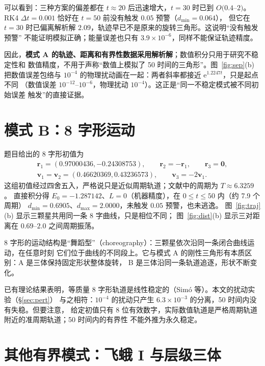 \documentclass[UTF8,fontset=windows,11pt,a4paper]{ctexart}
\newcommand{\vect}[1]{\mathbf{#1}}
\newcommand{\ee}{\mathrm{e}}
\begin{document}
可以看到：三种方案的偏差都在 $t\approx20$ 后迅速增大，$t=30$ 时已到 $O(0.4$--$2)$。
RK4 $\Delta t=0.001$ 恰好在 $t=50$ 前没有触发 $0.05$ 预警（$d_{\min}=0.064$），
但它在 $t=30$ 时已偏离解析解 $2.09$，轨迹早已不是原来的旋转三角形。这说明“没有触发预警”
不能证明模拟正确；能量误差也只有 $3.9\times10^{-6}$，同样不能保证轨迹精度。

因此，\textbf{模式 A 的轨迹、距离和有界性数据采用解析解}；数值积分只用于研究不稳定性和
数值精度，不用于声称“数值上模拟了 50 时间的三角形”。图~\ref{fig:sep}(b) 把数值误差包络与
$10^{-4}$ 的物理扰动画在一起：两者斜率都接近 $\ee^{1.2247t}$，只是起点不同
（数值误差 $10^{-12}$--$10^{-6}$，物理扰动 $10^{-4}$）。这正是“同一不稳定模式被不同初始误差
触发”的直接证据。

\section{模式 B：8 字形运动}\label{sec:eight}

题目给出的 8 字形初值为
\begin{gather}
\vect r_1=(0.97000436,-0.24308753),\qquad
\vect r_2=-\vect r_1,\qquad
\vect r_3=\vect 0,\label{eq:icB-r}\\
\vect v_1=\vect v_2=(0.46620369,0.43236573),\qquad
\vect v_3=-2\vect v_1.\label{eq:icB-v}
\end{gather}
这组初值经过四舍五入，严格说只是近似周期轨道；文献中的周期为 $T\approx6.3259$。
直接积分得 $E_0=-1.287142$、$L=0$（机器精度），在 $0\le t\le50$ 内（约 7.9 个周期）
$d_{\min}=0.6905$、$d_{\max}=2.0000$，未触发 $0.05$ 预警，也未逃逸。
图~\ref{fig:traj}(b) 显示三颗星共用同一条 8 字曲线，只是相位不同；
图~\ref{fig:dist}(b) 显示三对距离在 $0.69$--$2.0$ 之间周期振荡。

8 字形的运动结构是“舞蹈型”（choreography）：三颗星依次沿同一条闭合曲线运动，在任意时刻
它们位于曲线的不同段上。它与模式 A 的刚性三角形有本质区别：A 是三体保持固定形状整体旋转，
B 是三体沿同一条轨道追逐，形状不断变化。

已有理论结果表明，等质量 8 字形轨道是线性稳定的（Sim\'o 等）。本文的扰动实验（\S\ref{sec:pert}）
与之相符：$10^{-4}$ 的扰动只产生 $6.3\times10^{-3}$ 的分离，50 时间内没有失稳。但要注意，
给定初值只有 8 位有效数字，实际数值轨道是严格周期轨道附近的准周期轨道；50 时间内的有界性
不能外推为永久稳定。

\section{其他有界模式：飞蛾 I 与层级三体}\label{sec:others}
\end{document}

